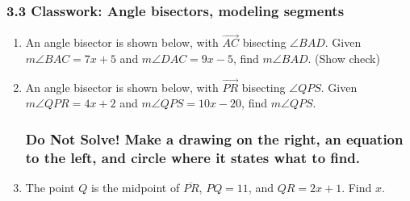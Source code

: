 \documentclass[12pt, twoside]{article}
\begin{document}
  \subsubsection*{3.3 Classwork: Angle bisectors, modeling segments}
  \begin{enumerate}

  \item An angle bisector is shown below, with $\overrightarrow{AC}$ bisecting $\angle BAD$. Given $m\angle BAC = 7x+5$ and $m\angle DAC = 9x-5$, find $m\angle BAD$. (Show check)
    \begin{flushright}
    \end{flushright} \vspace{3cm}

    \item An angle bisector is shown below, with $\overrightarrow{PR}$ bisecting $\angle QPS$. Given $m\angle QPR = 4x+2$ and $m\angle QPS = 10x-20$, find $m\angle QPS$.
    \begin{flushright}
    \end{flushright}

\newpage   
  \subsubsection*{Do Not Solve! Make a drawing on the right, an equation to the left, and circle where it states what to find.}
  \vspace{0.5cm}

\item The point $Q$ is the midpoint of $\overline{PR}$, $PQ=11$, and $QR=2x+1$. Find ${x}$.
\vspace{4cm}


\end{enumerate}
\end{document}
